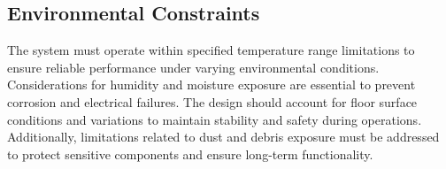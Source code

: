 \documentclass[../../main]{subfiles}
\begin{document}
\subsection{Environmental Constraints}

The system must operate within specified temperature range limitations to ensure reliable performance under varying environmental conditions. Considerations for humidity and moisture exposure are essential to prevent corrosion and electrical failures. The design should account for floor surface conditions and variations to maintain stability and safety during operations. Additionally, limitations related to dust and debris exposure must be addressed to protect sensitive components and ensure long-term functionality.






\newpage
\end{document}
